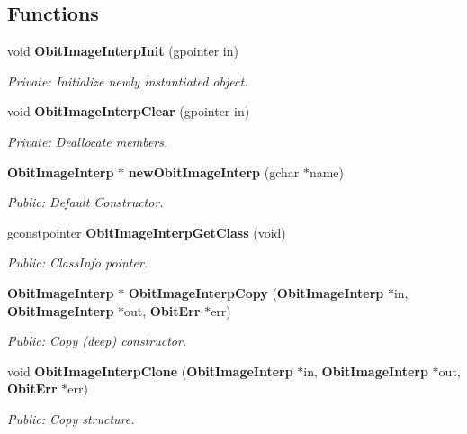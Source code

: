 \subsection*{Functions}
\begin{CompactItemize}
\item 
void {\bf Obit\-Image\-Interp\-Init} (gpointer in)
\begin{CompactList}\small\item\em Private: Initialize newly instantiated object. \item\end{CompactList}\item 
void {\bf Obit\-Image\-Interp\-Clear} (gpointer in)
\begin{CompactList}\small\item\em Private: Deallocate members. \item\end{CompactList}\item 
{\bf Obit\-Image\-Interp} $\ast$ {\bf new\-Obit\-Image\-Interp} (gchar $\ast$name)
\begin{CompactList}\small\item\em Public: Default Constructor. \item\end{CompactList}\item 
gconstpointer {\bf Obit\-Image\-Interp\-Get\-Class} (void)
\begin{CompactList}\small\item\em Public: Class\-Info pointer. \item\end{CompactList}\item 
{\bf Obit\-Image\-Interp} $\ast$ {\bf Obit\-Image\-Interp\-Copy} ({\bf Obit\-Image\-Interp} $\ast$in, {\bf Obit\-Image\-Interp} $\ast$out, {\bf Obit\-Err} $\ast$err)
\begin{CompactList}\small\item\em Public: Copy (deep) constructor. \item\end{CompactList}\item 
void {\bf Obit\-Image\-Interp\-Clone} ({\bf Obit\-Image\-Interp} $\ast$in, {\bf Obit\-Image\-Interp} $\ast$out, {\bf Obit\-Err} $\ast$err)
\begin{CompactList}\small\item\em Public: Copy structure. \item\end{CompactList}\item 

\end{CompactItemize}
